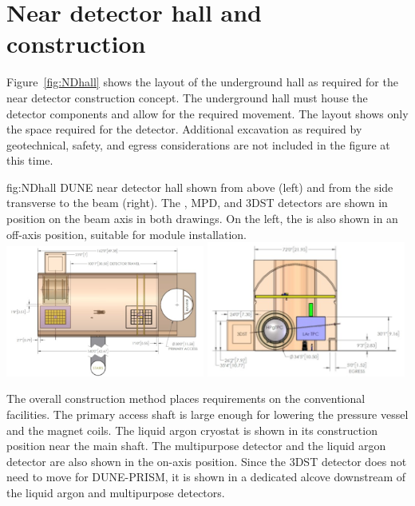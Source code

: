 \section{Near detector hall and construction}
\label{sec:exsum-nd-hall}
%

Figure~\ref{fig:NDhall} shows the layout of the underground hall as required for the near detector construction concept. The underground hall must house the detector components and allow for the required movement. The layout shows only the space required for the detector. Additional excavation as required by geotechnical, safety, and egress considerations are not included in the figure at this time.

\begin{dunefigure}{fig:NDhall}
{DUNE near detector hall shown from above (left) and from the side transverse to the beam (right). The , MPD, and 3DST detectors are shown in position on the beam axis in both drawings.  On the left, the  is also shown in an off-axis position, suitable for module installation. }
\includegraphics[width=0.49\textwidth]{graphics/NDhall1.jpg}
\includegraphics[width=0.49\textwidth]{graphics/NDhall2.jpg}
\end{dunefigure}

The overall construction method places requirements on the conventional facilities. 
The primary access shaft is large enough for lowering the pressure vessel and the magnet coils. The liquid argon cryostat is shown in its construction position near the main shaft. The multipurpose detector and the liquid argon detector are also shown in the on-axis position. Since the 3DST detector does not need to move for DUNE-PRISM, it is shown in a dedicated alcove downstream of the liquid argon and multipurpose detectors.

